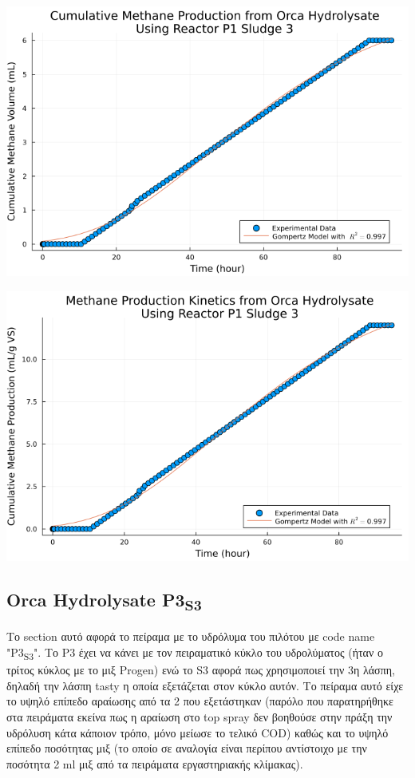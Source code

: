 \documentclass[11pt]{article}
\begin{document}
\begin{center}
\includegraphics[width=.9\linewidth]{../plots/BMPs/Orca Hydrolysate/methane_kinetics_orca_p1_s3_hour.png}
\end{center}

\begin{center}
\includegraphics[width=.9\linewidth]{../plots/BMPs/Orca Hydrolysate/specific_methane_kinetics_orca_p1_s3_hour.png}
\end{center}

\subsection{Orca Hydrolysate P3\textsubscript{S3}}
\label{sec:org23a308e}
Το section αυτό αφορά το πείραμα με το υδρόλυμα του πιλότου με code name "P3\textsubscript{S3}". Το P3 έχει να κάνει με τον πειραματικό κύκλο του υδρολύματος (ήταν ο τρίτος κύκλος με το μιξ Progen) ενώ το S3 αφορά πως χρησιμοποιεί την 3η λάσπη, δηλαδή την λάσπη tasty η οποία εξετάζεται στον κύκλο αυτόν. Το πείραμα αυτό είχε το υψηλό επίπεδο αραίωσης από τα 2 που εξετάστηκαν (παρόλο που παρατηρήθηκε στα πειράματα εκείνα πως η αραίωση στο top spray δεν βοηθούσε στην πράξη την υδρόλυση κάτα κάποιον τρόπο, μόνο μείωσε το τελικό COD) καθώς και το υψηλό επίπεδο ποσότητας μιξ (το οποίο σε αναλογία είναι περίπου αντίστοιχο με την ποσότητα 2 ml μιξ από τα πειράματα εργαστηριακής κλίμακας). 
\end{document}
